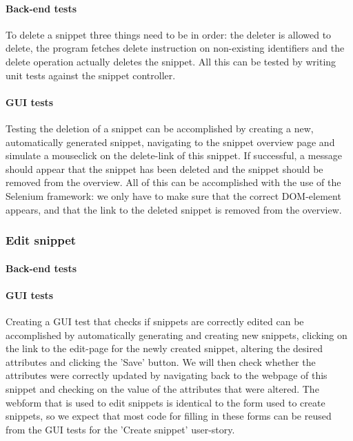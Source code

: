 \documentclass[10pt,a4paper,BCOR12mm, headexclude, footexclude,
  twoside, openright]{scrartcl}
\numberwithin{equation}{section} %
\numberwithin{figure}{section} %
\numberwithin{table}{section} %
\begin{document}
\paragraph{Back-end tests}
To delete a snippet three things need to be in order: the deleter is allowed to delete, the program fetches delete instruction on non-existing identifiers and the delete operation actually deletes the snippet.
All this can be tested by writing unit tests against the snippet controller.

\paragraph{GUI tests}
Testing the deletion of a snippet can be accomplished by creating a new, automatically generated snippet, navigating to the snippet overview page and simulate a mouseclick on the delete-link of this snippet.
If successful, a message should appear that the snippet has been deleted and the snippet should be removed from the overview.
All of this can be accomplished with the use of the Selenium framework: we only have to make sure that the correct DOM-element appears, and that the link to the deleted snippet is removed from the overview.

\subsubsection*{Edit snippet}

\paragraph{Back-end tests}

\paragraph{GUI tests}
Creating a GUI test that checks if snippets are correctly edited can be accomplished by automatically generating and creating new snippets, clicking on the link to the edit-page for the newly created snippet, altering the desired attributes and clicking the 'Save' button. We will then check whether the attributes were correctly updated by navigating back to the webpage of this snippet and checking on the value of the attributes that were altered.
The webform that is used to edit snippets is identical to the form used to create snippets, so we expect that most code for filling in these forms can be reused from the GUI tests for the 'Create snippet' user-story.
\end{document}
